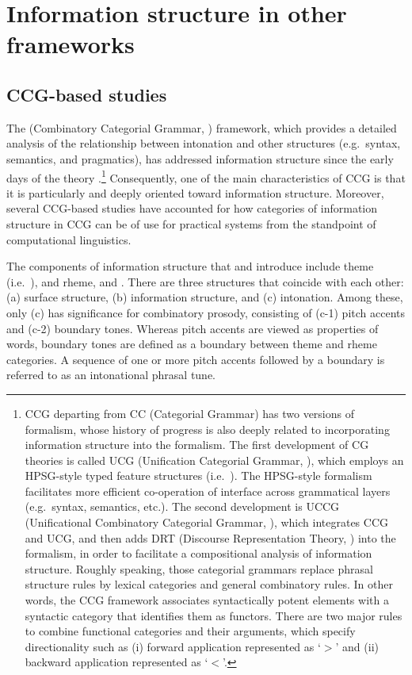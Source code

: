 \section{Information structure in other frameworks}
\label{8:sec:other-frameworks}


\subsection{CCG-based studies}
\label{8:ssec:ccg}

The  (Combinatory Categorial Grammar, \citealt{steedman:01})
framework, which provides a detailed analysis of the relationship
between intonation and other structures (e.g.\ syntax, semantics, and
pragmatics), has addressed information structure since the early days
of the theory \citep{steedman:00}.\footnote{CCG departing from CC
  (Categorial Grammar) has two versions of formalism, whose history of
  progress is also deeply related to incorporating information
  structure into the formalism. The first development of CG theories
  is called UCG (Unification Categorial Grammar, \citealt{zeevat:87}),
  which employs an HPSG-style typed feature structures
  (i.e.\ ). The HPSG-style formalism facilitates more
  efficient co-operation of interface across grammatical layers
  (e.g.\ syntax, semantics, etc.). The second development is UCCG
  (Unificational Combinatory Categorial Grammar,
  \citealt{traat:bos:04}), which integrates CCG and UCG, and then adds
  DRT (Discourse Representation Theory, \citealt{kamp:reyle:93}) into
  the formalism, in order to facilitate a compositional analysis of
  information structure.  Roughly speaking, those categorial grammars
  replace phrasal structure rules by lexical categories and general
  combinatory rules. In other words, the CCG framework associates
  syntactically potent elements with a syntactic category that
  identifies them as functors. There are two major rules to combine
  functional categories and their arguments, which specify
  directionality such as (i) forward application represented as
  `\ensuremath{>}' and (ii) backward application represented as
  `\ensuremath{<}'.} Consequently, one of the main characteristics of
CCG is that it is particularly and deeply oriented toward information
structure. Moreover, several CCG-based studies have accounted for how
categories of information structure in CCG can be of use for practical
systems from the standpoint of computational linguistics.


The components of information structure that \citet{steedman:00} and
\citet{traat:bos:04} introduce include theme (i.e.\ ), and rheme,
and . There are three structures that coincide with each other:
(a) surface structure, (b) information structure, and (c) intonation.
Among these, only (c) has significance for combinatory prosody,
consisting of (c-1) pitch accents and (c-2) boundary tones. Whereas
pitch accents are viewed as properties of words, boundary tones are
defined as a boundary between theme and rheme categories.  A sequence
of one or more pitch accents followed by a boundary is referred to as
an intonational phrasal tune.



